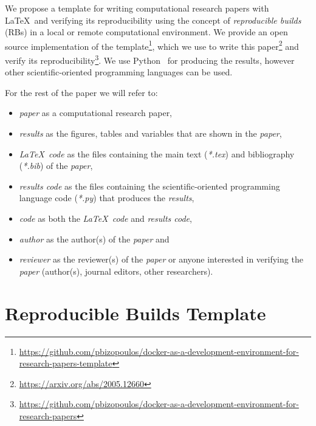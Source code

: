 \documentclass[journal]{IEEEtran}
\begin{document}
We propose a template for writing computational research papers with \LaTeX\ and verifying  its reproducibility using the concept of \textit{reproducible builds} (RBs) in a local or remote computational environment.
We provide an open source implementation of the template\footnote{\url{https://github.com/pbizopoulos/docker-as-a-development-environment-for-research-papers-template}}, which we use to write this paper\footnote{\url{https://arxiv.org/abs/2005.12660}} and verify its reproducibility\footnote{\url{https://github.com/pbizopoulos/docker-as-a-development-environment-for-research-papers}}.
We use Python~\cite{van2007python} for producing the results, however other scientific-oriented programming languages can be used.

For the rest of the paper we will refer to:
\begin{itemize}
	\item \textit{paper} as a computational research paper,
	\item \textit{results} as the figures, tables and variables that are shown in the \textit{paper},
	\item \textit{\LaTeX\ code} as the files containing the main text (\textit{*.tex}) and bibliography (\textit{*.bib}) of the \textit{paper},
	\item \textit{results code} as the files containing the scientific-oriented programming language code (\textit{*.py}) that produces the \textit{results},
	\item \textit{code} as both the \textit{\LaTeX\ code} and \textit{results code},
	\item \textit{author} as the author(s) of the \textit{paper} and
	\item \textit{reviewer} as the reviewer(s) of the \textit{paper} or anyone interested in verifying the \textit{paper} (author(s), journal editors, other researchers).
\end{itemize}

\section{Reproducible Builds Template}
\end{document}
